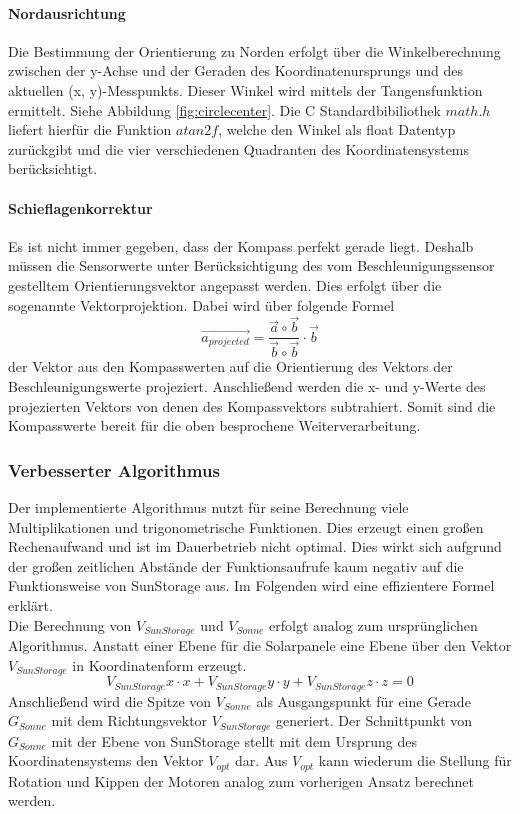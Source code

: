 \paragraph{Nordausrichtung}
Die Bestimmung der Orientierung zu Norden erfolgt über die Winkelberechnung zwischen der 
y-Achse und der Geraden des Koordinatenursprungs und des aktuellen (x, y)-Messpunkts. 
Dieser Winkel wird mittels der Tangensfunktion ermittelt. Siehe Abbildung \autoref{fig:circlecenter}.
Die C Standardbibiliothek $math.h$ liefert hierfür die Funktion $atan2f$, 
welche den Winkel als float Datentyp zurückgibt 
und die vier verschiedenen Quadranten des Koordinatensystems berücksichtigt.

\paragraph{Schieflagenkorrektur}
Es ist nicht immer gegeben, dass der Kompass perfekt gerade liegt. 
Deshalb müssen die Sensorwerte unter Berücksichtigung des vom Beschleunigungssensor 
gestelltem Orientierungsvektor angepasst werden. 
Dies erfolgt über die sogenannte Vektorprojektion. 
Dabei wird über folgende Formel \[\vec{a_{projected}} = \frac{\vec{a} \circ \vec{b}}{\vec{b} \circ \vec{b}} \cdot \vec{b} \]
der Vektor aus den Kompasswerten auf die Orientierung des Vektors der Beschleunigungswerte projeziert. 
Anschließend werden die x- und y-Werte des projezierten Vektors von denen des Kompassvektors subtrahiert. 
Somit sind die Kompasswerte bereit für die oben besprochene Weiterverarbeitung.

\subsubsection{Verbesserter Algorithmus}
Der implementierte Algorithmus nutzt für seine Berechnung viele Multiplikationen und trigonometrische Funktionen.
Dies erzeugt einen großen Rechenaufwand und ist im Dauerbetrieb nicht optimal.
Dies wirkt sich aufgrund der großen zeitlichen Abstände der Funktionsaufrufe kaum negativ auf die Funktionsweise von SunStorage aus.
Im Folgenden wird eine effizientere Formel erklärt.\\
Die Berechnung von $ V_{SunStorage} $  und $ V_{Sonne} $ erfolgt analog zum ursprünglichen Algorithmus.
Anstatt einer Ebene für die Solarpanele eine Ebene über den Vektor $ V_{SunStorage} $ in Koordinatenform erzeugt.
\[V_{SunStorage}x \cdot x + V_{SunStorage}y \cdot y + V_{SunStorage}z \cdot z = 0\] 
Anschließend wird die Spitze von $ V_{Sonne} $ als Ausgangspunkt für eine Gerade $ G_{Sonne} $ mit dem Richtungsvektor $ V_{SunStorage} $ generiert.
Der Schnittpunkt von $ G_{Sonne} $ mit der Ebene von SunStorage stellt mit dem Ursprung des Koordinatensystems den Vektor $ V_{opt} $ dar.
Aus $ V_{opt} $ kann wiederum die Stellung für Rotation und Kippen der Motoren analog zum vorherigen Ansatz berechnet werden.

